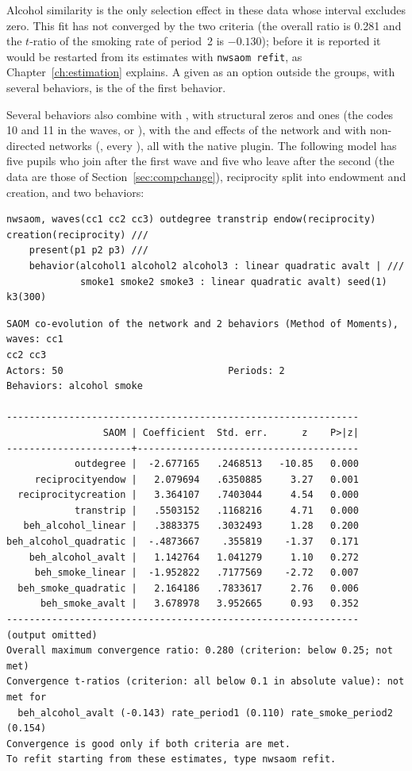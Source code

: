 Alcohol similarity is the only selection effect in these data whose interval excludes zero. This fit has not converged by the two criteria (the overall ratio is 0.281 and the $t$-ratio of the smoking rate of period~2 is $-0.130$); before it is reported it would be restarted from its estimates with \texttt{nwsaom refit}, as Chapter~\ref{ch:estimation} explains. A  given as an option outside the groups, with several behaviors, is the  of the first behavior.

Several behaviors also combine with , with structural zeros and ones (the codes 10 and 11 in the waves, or ), with the  and  effects of the network and with non-directed networks (, every ), all with the native plugin. The following model has five pupils who join after the first wave and five who leave after the second (the data are those of Section~\ref{sec:compchange}), reciprocity split into endowment and creation, and two behaviors:
\begin{lstlisting}
nwsaom, waves(cc1 cc2 cc3) outdegree transtrip endow(reciprocity) creation(reciprocity) ///
    present(p1 p2 p3) ///
    behavior(alcohol1 alcohol2 alcohol3 : linear quadratic avalt | ///
             smoke1 smoke2 smoke3 : linear quadratic avalt) seed(1) k3(300)
\end{lstlisting}
\begin{lstlisting}
SAOM co-evolution of the network and 2 behaviors (Method of Moments), waves: cc1
cc2 cc3
Actors: 50                             Periods: 2
Behaviors: alcohol smoke

--------------------------------------------------------------
                 SAOM | Coefficient  Std. err.      z    P>|z|
----------------------+---------------------------------------
            outdegree |  -2.677165   .2468513   -10.85   0.000
     reciprocityendow |   2.079694   .6350885     3.27   0.001
  reciprocitycreation |   3.364107   .7403044     4.54   0.000
            transtrip |   .5503152   .1168216     4.71   0.000
   beh_alcohol_linear |   .3883375   .3032493     1.28   0.200
beh_alcohol_quadratic |  -.4873667    .355819    -1.37   0.171
    beh_alcohol_avalt |   1.142764   1.041279     1.10   0.272
     beh_smoke_linear |  -1.952822   .7177569    -2.72   0.007
  beh_smoke_quadratic |   2.164186   .7833617     2.76   0.006
      beh_smoke_avalt |   3.678978   3.952665     0.93   0.352
--------------------------------------------------------------
(output omitted)
Overall maximum convergence ratio: 0.280 (criterion: below 0.25; not met)
Convergence t-ratios (criterion: all below 0.1 in absolute value): not met for
  beh_alcohol_avalt (-0.143) rate_period1 (0.110) rate_smoke_period2 (0.154)
Convergence is good only if both criteria are met.
To refit starting from these estimates, type nwsaom refit.
\end{lstlisting}
